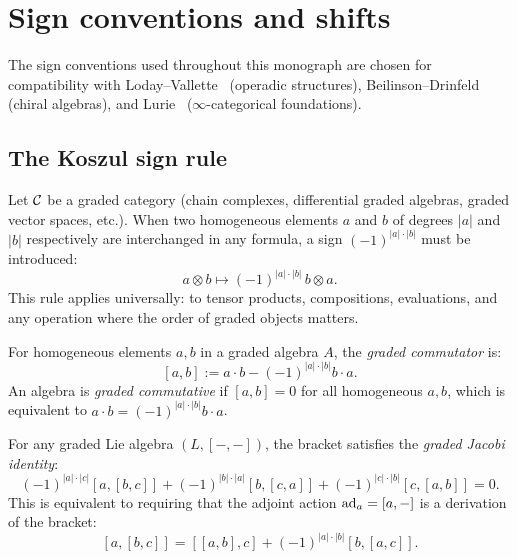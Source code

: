\chapter{Sign conventions and shifts}
\label{app:signs}


The sign conventions used throughout this monograph are chosen for compatibility with
Loday--Vallette~\cite{LV12} (operadic structures),
Beilinson--Drinfeld~\cite{BD} (chiral algebras), and Lurie~\cite{HA}
($\infty$-categorical foundations).

\section{The Koszul sign rule}
\label{sec:koszul-sign-rule}

\begin{convention}
\label{conv:koszul}
Let $\mathcal{C}$ be a graded category (chain complexes, differential graded algebras, 
graded vector spaces, etc.). When two homogeneous elements $a$ and $b$ of 
degrees $|a|$ and $|b|$ respectively are interchanged in any formula, a sign 
$(-1)^{|a| \cdot |b|}$ must be introduced:
\[
a \otimes b \longmapsto (-1)^{|a| \cdot |b|} \, b \otimes a.
\]
This rule applies universally: to tensor products, compositions, evaluations, 
and any operation where the order of graded objects matters.
\end{convention}

\begin{definition}
\label{def:graded-commutator}
For homogeneous elements $a, b$ in a graded algebra $A$, the 
\emph{graded commutator} is:
\[
[a, b] := a \cdot b - (-1)^{|a| \cdot |b|} b \cdot a.
\]
An algebra is \emph{graded commutative} if $[a, b] = 0$ for all homogeneous 
$a, b$, which is equivalent to $a \cdot b = (-1)^{|a| \cdot |b|} b \cdot a$.
\end{definition}

\begin{proposition}
\label{prop:graded-jacobi}
For any graded Lie algebra $(L, [-,-])$, the bracket satisfies the 
\emph{graded Jacobi identity}:
\[
(-1)^{|a| \cdot |c|} [a, [b, c]] + (-1)^{|b| \cdot |a|} [b, [c, a]] 
+ (-1)^{|c| \cdot |b|} [c, [a, b]] = 0.
\]
This is equivalent to requiring that the adjoint action $\operatorname{ad}_a = [a, -]$ 
is a derivation of the bracket:
\[
[a, [b, c]] = [[a, b], c] + (-1)^{|a| \cdot |b|} [b, [a, c]].
\]
\end{proposition}

